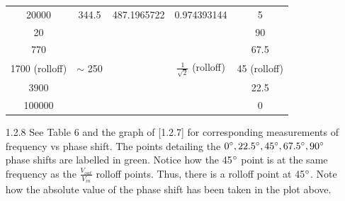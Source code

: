 \documentclass{article}
\begin{document}
\begin{itemize}
\begin{table}[h]
\begin{tabular}{ccccc}
    20000                                       & 344.5                                  & 487.1965722                            & 0.974393144                           & 5                                          \\
    20                                          &                                        &                                        &                                       & 90                                         \\
    770                                         &                                        &                                        &                                       & 67.5                                       \\
    1700 (rolloff)                                        &                         $\sim$ 250              &                                        &     $\frac{1}{\sqrt{2}}$ (rolloff)                                  & 45 (rolloff)                                         \\
    3900                                        &                                        &                                        &                                       & 22.5                                       \\
    100000                  &                   &                    &                 & 0                  
    \end{tabular}
    \end{table}
    
    \item[1.2.8] See Table 6 and the graph of [1.2.7] for corresponding measurements of frequency vs phase shift. The points detailing the $0\degree,22.5\degree,45\degree,67.5\degree,90\degree$ phase shifts are labelled in green. Notice how the 45$\degree$ point is at the same frequency as the $\frac{V_{out}}{V_{in}}$ rolloff points. Thus, there is a rolloff point at 45$\degree$. Note how the absolute value of the phase shift has been taken in the plot above.
    

\end{itemize}
\end{document}
